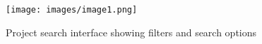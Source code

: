\begin{figure}[H]
    \centering
    \texttt{[image: images/image1.png]}
    \caption{Project search interface showing filters and search options}
    \label{fig:search_interface}
\end{figure}
